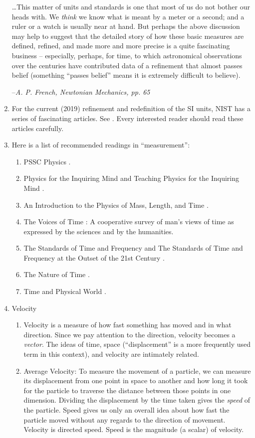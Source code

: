 \documentclass[12pt,a4paper]{book}
\begin{document}
\begin{enumerate}
        \epigraph
        {
            \dots This matter of units and standards is one that most of us do not bother our heads with. We \emph{think} we know what is meant by a meter or a second; and a ruler or a watch is usually near at hand. But perhaps the above discussion may help to suggest that the detailed story of how these basic measures are defined, refined, and made more and more precise is a quite fascinating business -- especially, perhaps, for time, to which astronomical observations over the centuries have contributed data of a refinement that almost passes belief (something ``passes belief'' means it is extremely difficult to believe).
        }
        {
            --\textit{A. P. French, Newtonian Mechanics, pp. 65}
        }
    \item For the current (2019) refinement and redefinition of the SI units, NIST has a series of fascinating articles. See \cite{nist-revised-si}. Every interested reader should read these articles carefully.
    \item Here is a list of recommended readings in ``measurement'':
        \begin{enumerate}
            \item PSSC Physics \cite{pssc-physics}.
            \item Physics for the Inquiring Mind \cite{pim} and Teaching Physics for the Inquiring Mind \cite{tpim}.
            \item An Introduction to the Physics of Mass, Length, and Time \cite{intro-to-phy-mass-length-time}.
            \item The Voices of Time \cite{voices-of-time}: A cooperative survey of man's views of time as expressed by the sciences and by the humanities.
            \item The Standards of Time and Frequency \cite{stf} and The Standards of Time and Frequency at the Outset of the 21st Century \cite{stf21}.
            \item The Nature of Time \cite{nature-of-time}.
            \item Time and Physical World \cite{time-and-physical-world}.
        \end{enumerate}
    \item Velocity
        \begin{enumerate}
            \item Velocity is a measure of how fast something has moved and in what direction. Since we pay attention to the direction, velocity becomes a \emph{vector}. The ideas of time, space (``displacement'' is a more frequently used term in this context), and velocity are intimately related. 
            \item Average Velocity: To measure the movement of a particle, we can measure its displacement from one point in space to another and how long it took for the particle to traverse the distance between those points in one dimension. Dividing the displacement by the time taken gives the \emph{speed} of the particle. Speed gives us only an overall idea about how fast the particle moved without any regards to the direction of movement. Velocity is directed speed. Speed is the magnitude (a scalar) of velocity.
                

\end{enumerate}
\end{enumerate}
\end{document}
